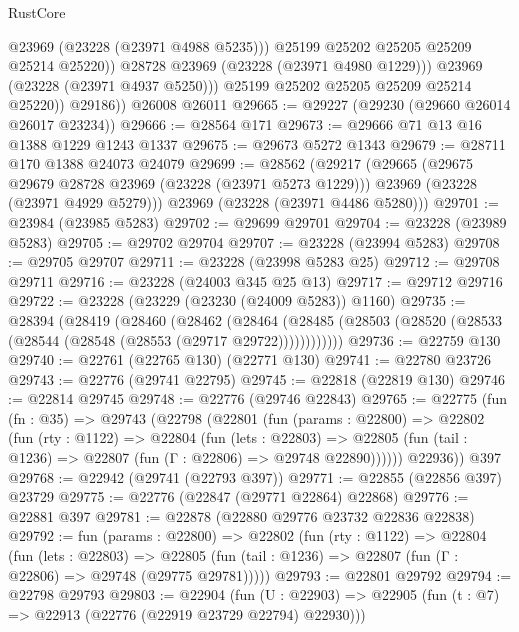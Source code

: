 \begin{lexlean}{RustCore}
\begin{coremodule}
                      @23969
                      (@23228 (@23971 @4988 @5235)))
                    @25199
                    @25202
                    @25205
                    @25209
                    @25214
                    @25220))
                @28728
                @23969
                (@23228 (@23971 @4980 @1229)))
              @23969
              (@23228 (@23971 @4937 @5250)))
            @25199
            @25202
            @25205
            @25209
            @25214
            @25220))
        @29186))
    @26008
    @26011
@29665 := @29227 (@29230 (@29660 @26014 @26017 @23234))
@29666 := @28564 @171
@29673 := @29666 @71 @13 @16 @1388 @1229 @1243 @1337
@29675 := @29673 @5272 @1343
@29679 := @28711 @170 @1388 @24073 @24079
@29699 := @28562
    (@29217
      (@29665
        (@29675 @29679 @28728 @23969 (@23228 (@23971 @5273 @1229)))
        @23969
        (@23228 (@23971 @4929 @5279)))
      @23969
      (@23228 (@23971 @4486 @5280)))
@29701 := @23984 (@23985 @5283)
@29702 := @29699 @29701
@29704 := @23228 (@23989 @5283)
@29705 := @29702 @29704
@29707 := @23228 (@23994 @5283)
@29708 := @29705 @29707
@29711 := @23228 (@23998 @5283 @25)
@29712 := @29708 @29711
@29716 := @23228 (@24003 @345 @25 @13)
@29717 := @29712 @29716
@29722 := @23228 (@23229 (@23230 (@24009 @5283)) @1160)
@29735 := @28394
    (@28419
      (@28460
        (@28462
          (@28464 (@28485 (@28503 (@28520 (@28533 (@28544 (@28548 (@28553 (@29717 @29722))))))))))))
@29736 := @22759 @130
@29740 := @22761 (@22765 @130) (@22771 @130)
@29741 := @22780 @23726
@29743 := @22776 (@29741 @22795)
@29745 := @22818 (@22819 @130)
@29746 := @22814 @29745
@29748 := @22776 (@29746 @22843)
@29765 := @22775
    (fun (fn : @35) =>
    @29743
      (@22798
        (@22801
          (fun (params : @22800) =>
          @22802
            (fun (rty : @1122) =>
            @22804
              (fun (lets : @22803) =>
              @22805 (fun (tail : @1236) => @22807 (fun (Γ : @22806) => @29748 @22890))))))
        @22936))
    @397
@29768 := @22942 (@29741 (@22793 @397))
@29771 := @22855 (@22856 @397) @23729
@29775 := @22776 (@22847 (@29771 @22864) @22868)
@29776 := @22881 @397
@29781 := @22878 (@22880 @29776 @23732 @22836 @22838)
@29792 := fun (params : @22800) =>
  @22802
    (fun (rty : @1122) =>
    @22804
      (fun (lets : @22803) =>
      @22805 (fun (tail : @1236) => @22807 (fun (Γ : @22806) => @29748 (@29775 @29781)))))
@29793 := @22801 @29792
@29794 := @22798 @29793
@29803 := @22904
    (fun (U : @22903) => @22905 (fun (t : @7) => @22913 (@22776 (@22919 @23729 @22794) @22930)))

\end{coremodule}
\end{lexlean}

